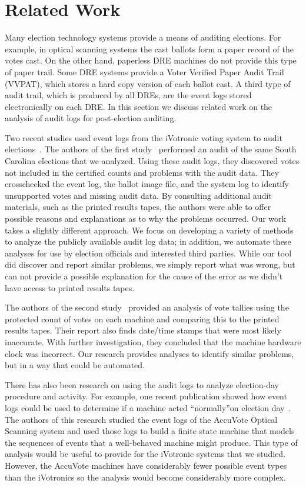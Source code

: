 \section{Related Work}
Many election technology systems provide a means of auditing elections. For example, in optical scanning systems the cast ballots form a paper record of the votes cast.  On the other hand, paperless DRE machines do not provide this type of paper trail. Some DRE systems provide a Voter Verified Paper Audit Trail (VVPAT), which stores a hard copy version of each ballot cast.  A third type of audit trail, which is produced by all DREs, are the event logs stored electronically on each DRE.  In this section we discuss related work on the analysis of audit logs for post-election auditing. 

Two recent studies used event logs from the iVotronic voting system to audit elections~\cite{Buell2011,Sandler2007}. The authors of the first study~\cite{Buell2011} performed an audit of the same South Carolina elections that we analyzed. Using these audit logs, they discovered votes not included in the certified counts and problems with the audit data. They crosschecked the event log, the ballot image file, and the system log to identify unsupported votes and missing audit data.  By consulting additional audit materials, such as the printed results tapes, the authors were able to offer possible reasons and explanations as to why the problems occurred. Our work takes a slightly different approach.  We focus on developing a variety of methods to analyze the publicly available audit log data; in addition, we automate these analyses for use by election officials and interested third parties.  While our tool did discover and report similar problems, we simply report what was wrong, but can not provide a possible explanation for the cause of the error as we didn't have access to printed results tapes. 

The authors of the second study~\cite{Sandler2007} provided an analysis of vote tallies using the protected count of votes on each machine and comparing this to the printed results tapes. Their report also finds date/time stamps that were most likely inaccurate.  With further investigation, they concluded that the machine hardware clock was incorrect. Our research provides analyses to identify similar problems, but in a way that could be automated. 

There has also been research on using the audit logs to analyze election-day procedure and activity. For example, one recent publication showed how event logs could be used to determine if a machine acted \textquotedblleft normally\textquotedblright on election day~\cite{Antonyan2009}. The authors of this research studied the event logs of the AccuVote Optical Scanning system and used those logs to build a finite state machine that models the sequences of events that a well-behaved machine might produce. This type of analysis would be useful to provide for the iVotronic systems that we studied. However, the AccuVote machines have considerably fewer possible event types than the iVotronics so the analysis would become considerably more complex. 

